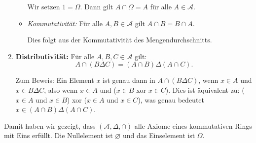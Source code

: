 \documentclass{article}
\newcommand{\Om}{\Omega}
\renewcommand{\AA}{\mathcal{A}}
\theoremstyle{definition}
\begin{document}
\begin{enumerate}
\begin{itemize}
        Wir setzen $1 = \Om$. Dann gilt $A \cap \Om = A$ für alle $A \in \AA$.
        
        \item \textit{Kommutativität:} Für alle $A, B \in \AA$ gilt $A \cap B = B \cap A$.
        
        Dies folgt aus der Kommutativität des Mengendurchschnitts.
    \end{itemize}
    
    \item \textbf{Distributivität:} Für alle $A, B, C \in \AA$ gilt:
    \[
    A \cap (B \Delta C) = (A \cap B) \Delta (A \cap C).
    \]
    
    Zum Beweis: Ein Element $x$ ist genau dann in $A \cap (B \Delta C)$, wenn $x \in A$ und $x \in B \Delta C$, also wenn $x \in A$ und ($x \in B$ xor $x \in C$). Dies ist äquivalent zu: ($x \in A$ und $x \in B$) xor ($x \in A$ und $x \in C$), was genau bedeutet $x \in (A \cap B) \Delta (A \cap C)$.
\end{enumerate}

Damit haben wir gezeigt, dass $(\AA, \Delta, \cap)$ alle Axiome eines kommutativen Rings mit Eins erfüllt. Die Nullelement ist $\varnothing$ und das Einselement ist $\Om$.
\end{document}

